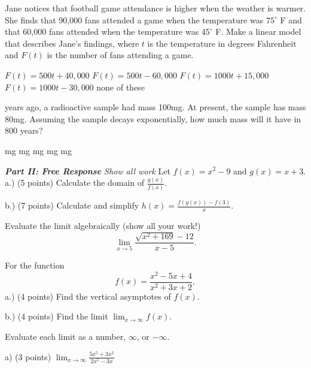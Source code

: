 \documentclass[11pt]{article}
\begin{document}
\begin{questions}
\begin{multiplechoice}{5}
\question Jane notices that football game attendance is higher when the weather is warmer.  She finds that 90,000 fans attended a game when the temperature was $75^\circ$ F and that 60,000 fans attended when the temperature was $45^\circ$ F.  Make a linear model that describes Jane's findings, where $t$ is the temperature in degrees Fahrenheit and $F(t)$ is the number of fans attending a game.
\begin{answers}{3}
\ans $F(t) = 500t+40,000$
\ans $F(t) = 500t - 60,000$
\ans $F(t) = 1000t+15,000$
\ans $F(t) = 1000t-30,000$
\ans none of these
\end{answers}

 years ago, a radioactive sample had mass 100mg.  At present, the sample has mass 80mg.  Assuming the sample decays exponentially, how much mass will it have in 800 years?
\begin{answers}{2}
 mg
 mg
 mg
 mg
 mg %
\end{answers}


\end{multiplechoice}
\vspace{.2in}

\nextpage
\noindent \emph{{\bf Part II: Free Response}{  Show all work}}
\question[12] Let $f(x)=x^2-9$ and $g(x) = x+3$.\\

a.) (5 points) Calculate the domain of $\frac{g(x)}{f(x)}$.
\vspace{1.25in}

b.) (7 points) Calculate and simplify $h(x) = \frac{f(g(x))-f(3)}{x}$.
\vspace{2.25in}




\question[10] Evaluate the limit algebraically (show all your work!)
\[\lim_{x\to 5} \frac{\sqrt{x^2+169} - 12}{x-5}.\]
\vspace{3.25in}

\question[8] For the function 
\[f(x) = \frac{x^2-5x+4}{x^2+3x+2},\]
a.) (4 points) Find the vertical asymptotes of $f(x)$.
\vspace{2.25in}

b.) (4 points) Find the limit $\lim_{x\to \infty} f(x)$.
\vspace{2.25in}

\question[15] Evaluate each limit as a number, $\infty$, or $-\infty$.

a) (3 points) $\displaystyle \lim_{x\to\infty} \frac{5x^5 + 3x^2}{2x^5 - 3x}$


\end{questions}
\end{document}
